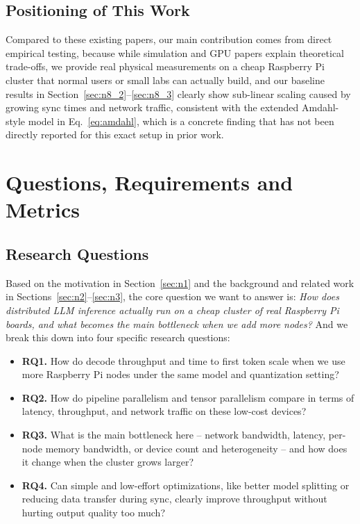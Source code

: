 \documentclass[11pt,a4paper]{article}
\begin{document}
\subsection{Positioning of This Work}\label{sec:n3_4}
Compared to these existing papers, our main contribution comes from direct empirical testing, because while simulation and GPU papers explain theoretical trade-offs, we provide real physical measurements on a cheap Raspberry Pi cluster that normal users or small labs can actually build, and our baseline results in Section~\ref{sec:n8_2}--\ref{sec:n8_3} clearly show sub-linear scaling caused by growing sync times and network traffic, consistent with the extended Amdahl-style model in Eq.~\ref{eq:amdahl}, which is a concrete finding that has not been directly reported for this exact setup in prior work.

\section{Questions, Requirements and Metrics}\label{sec:n4}

\subsection{Research Questions}\label{sec:n4_1}

Based on the motivation in Section~\ref{sec:n1} and the background and related work in Sections~\ref{sec:n2}--\ref{sec:n3}, the core question we want to answer is: \emph{How does distributed LLM inference actually run on a cheap cluster of real Raspberry Pi boards, and what becomes the main bottleneck when we add more nodes?} And we break this down into four specific research questions:

\begin{itemize}
\item \textbf{RQ1.} How do decode throughput and time to first token scale when we use more Raspberry Pi nodes under the same model and quantization setting?
\item \textbf{RQ2.} How do pipeline parallelism and tensor parallelism compare in terms of latency, throughput, and network traffic on these low-cost devices?
\item \textbf{RQ3.} What is the main bottleneck here -- network bandwidth, latency, per-node memory bandwidth, or device count and heterogeneity -- and how does it change when the cluster grows larger?
\item \textbf{RQ4.} Can simple and low-effort optimizations, like better model splitting or reducing data transfer during sync, clearly improve throughput without hurting output quality too much?
\end{itemize}
\end{document}

